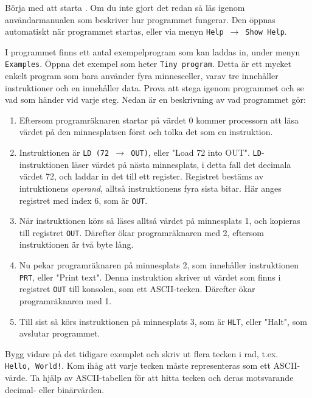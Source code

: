 \begin{Datorarbete}
    \item {} Börja med att starta \progname{}. Om du inte gjort det redan så läs igenom användarmanualen som beskriver hur programmet fungerar. Den öppnas automatiskt när programmet startas, eller via menyn \texttt{Help}~$\rightarrow$~\texttt{Show Help}.

    \item {} I programmet finns ett antal exempelprogram som kan laddas in, under menyn \texttt{Examples}. Öppna det exempel som heter \texttt{Tiny program}. Detta är ett mycket enkelt program som bara använder fyra minnesceller, varav tre innehåller instruktioner och en innehåller data. Prova att stega igenom programmet och se vad som händer vid varje steg. Nedan är en beskrivning av vad programmet gör:
    \begin{enumerate}
        \item Eftersom programräknaren startar på värdet 0 kommer processorn att läsa värdet på den minnesplatsen först och tolka det som en instruktion.
        \item Instruktionen är \texttt{LD (72 $\rightarrow$ OUT)}, eller "Load 72 into OUT". \texttt{LD}-instruktionen läser värdet på nästa minnesplats, i detta fall det decimala värdet 72, och laddar in det till ett register. Registret bestäms av intruktionens \emph{operand}, alltså instruktionens fyra sista bitar. Här anges registret med index 6, som är \texttt{OUT}.
        \item När instruktionen körs så läses alltså värdet på minnesplats 1, och kopieras till registret \texttt{OUT}. Därefter ökar programräknaren med 2, eftersom instruktionen är två byte lång.
        \item Nu pekar programräknaren på minnesplats 2, som innehåller instruktionen \texttt{PRT}, eller "Print text". Denna instruktion skriver ut värdet som finns i registret \texttt{OUT} till konsolen, som ett ASCII-tecken. Därefter ökar programräknaren med 1.
        \item Till sist så körs instruktionen på minnesplats 3, som är \texttt{HLT}, eller "Halt", som avslutar programmet.
    \end{enumerate}

    \item {} Bygg vidare på det tidigare exemplet och skriv ut flera tecken i rad, t.ex. \texttt{Hello,~World!}. Kom ihåg att varje tecken måste representeras som ett ASCII-värde. Ta hjälp av ASCII-tabellen för att hitta tecken och deras motsvarande decimal- eller binärvärden.


\end{Datorarbete}
